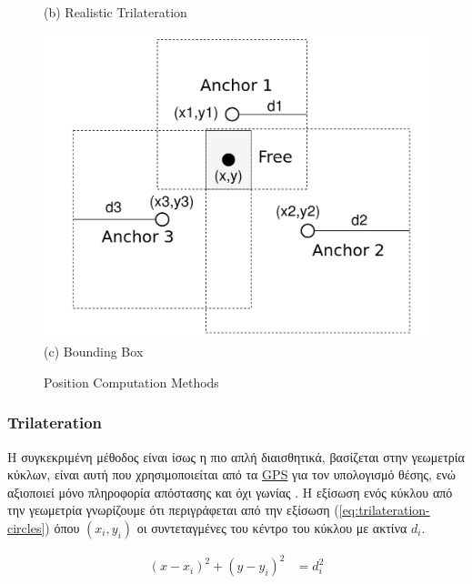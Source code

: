 \begin{figure} [H]
\begin{minipage}{.33\textwidth}
			{(b) Realistic Trilateration}
		\end{minipage}
		\begin{minipage}{.33\textwidth}
			\centering
			\includegraphics[width=\linewidth]{../Photos/Bounding-box.png}\\
			{(c) Bounding Box}
		\end{minipage}
    \hfill \break
    \decoRule
    \caption[Position Computation Methods]{Position Computation Methods}
    \label{fig:Position-Computation-Methods}
\end{figure}

\subsubsection{Trilateration}
Η συγκεκριμένη μέθοδος είναι ίσως η πιο απλή διαισθητικά, βασίζεται στην γεωμετρία κύκλων, είναι αυτή που χρησιμοποιείται από τα \hyperref[abbr:GPS]{GPS}
για τον υπολογισμό θέσης, ενώ αξιοποιεί μόνο πληροφορία απόστασης και όχι γωνίας \cite{Trilateration-vs-Triangulation}.
Η εξίσωση ενός κύκλου από την γεωμετρία γνωρίζουμε ότι περιγράφεται από την εξίσωση (\ref{eq:trilateration-circles}) όπου $(x_i,y_i)$ οι συντεταγμένες
του κέντρο του κύκλου με ακτίνα $d_i$.

\begin{align}
	(x-x_i)^2 + (y-y_i)^2 &= d_i^2 \label{eq:trilateration-circles}
\end{align}

